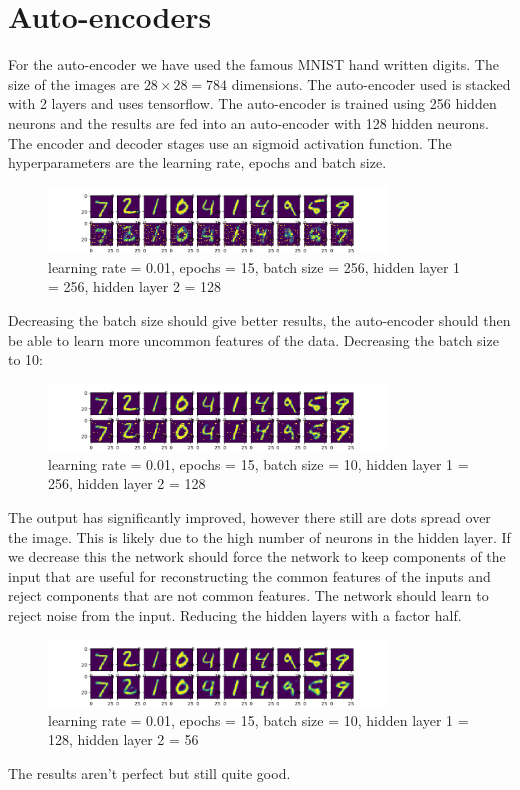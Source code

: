\documentclass[11pt]{article}
\begin{document}
\section{Auto-encoders}
For the auto-encoder we have used the famous MNIST hand written digits. The size of the images are $28\times28=784$ dimensions. The auto-encoder used is stacked with 2 layers and uses tensorflow. The auto-encoder is trained using 256 hidden neurons and the results are fed into an auto-encoder with 128 hidden neurons. The encoder and decoder stages use an sigmoid activation function. The hyperparameters  are the learning rate, epochs and batch size.
\begin{figure}[h]
  \centering
    \includegraphics[width=0.8\textwidth]{0,01-15-256-256-128.png}
  \caption{learning rate = 0.01, epochs = 15, batch size = 256, hidden layer 1 = 256, hidden layer 2 = 128}
\end{figure}

Decreasing the batch size should give better results, the auto-encoder should then be able to learn more uncommon features of the data. Decreasing the batch size to 10:

\begin{figure}[h]
  \centering
    \includegraphics[width=0.8\textwidth]{0,01-15-10-256-128.png}
  \caption{learning rate = 0.01, epochs = 15, batch size = 10, hidden layer 1 = 256, hidden layer 2 = 128}
\end{figure}
The output has significantly improved, however there still are dots spread over the image. This is likely due to the high number of neurons in the hidden layer. If we decrease this the network should force the network to keep components of the input that are useful for reconstructing the common features of the inputs and reject components that are not common features. The network should learn to reject noise from the input. Reducing the hidden layers with a factor half. 
\begin{figure}[h]
  \centering
    \includegraphics[width=0.8\textwidth]{0,01-15-10-128-56.png}
  \caption{learning rate = 0.01, epochs = 15, batch size = 10, hidden layer 1 = 128, hidden layer 2 = 56}
\end{figure}
The results aren't perfect but still quite good. 
\end{document}
